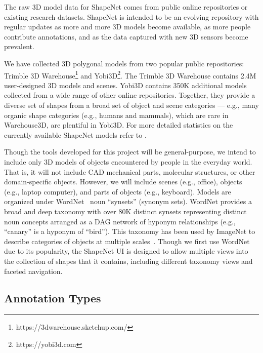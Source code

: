 The raw 3D model data for ShapeNet comes from public online repositories or existing research datasets. ShapeNet is intended to be an evolving repository with regular updates as more and more 3D models become available, as more people contribute annotations, and as the data captured with new 3D sensors become prevalent.

We have collected 3D polygonal models from two popular public repositories: Trimble 3D Warehouse\footnote{https://3dwarehouse.sketchup.com/} and Yobi3D\footnote{https://yobi3d.com}. The Trimble 3D Warehouse contains 2.4M user-designed 3D models and scenes.  Yobi3D contains 350K additional models collected from a wide range of other online repositories. Together, they provide a diverse set of shapes from a broad set of object and scene categories --- e.g., many organic shape categories (e.g., humans and mammals), which are rare in Warehouse3D, are plentiful in Yobi3D.  For more detailed statistics on the currently available ShapeNet models refer to .

Though the tools developed for this project will be general-purpose, we intend to include only 3D models of objects encountered by people in the everyday world.  That is, it will not include CAD mechanical parts, molecular structures, or other domain-specific objects.  However, we will include scenes (e.g., office), objects (e.g., laptop computer), and parts of objects (e.g., keyboard).  Models are organized under WordNet~\cite{miller:1995:wordnet} noun ``synsets'' (synonym sets).  WordNet provides a broad and deep taxonomy with over 80K distinct synsets representing distinct noun concepts arranged as a DAG network of hyponym relationships (e.g., ``canary'' is a hyponym of ``bird'').  This taxonomy has been used by ImageNet to describe categories of objects at multiple scales~\cite{deng:2009:imagenet}.  Though we first use WordNet due to its popularity, the ShapeNet UI is designed to allow multiple views into the collection of shapes that it contains, including different taxonomy views and faceted navigation.

\subsection{Annotation Types}
\label{sec:annotation-types}

